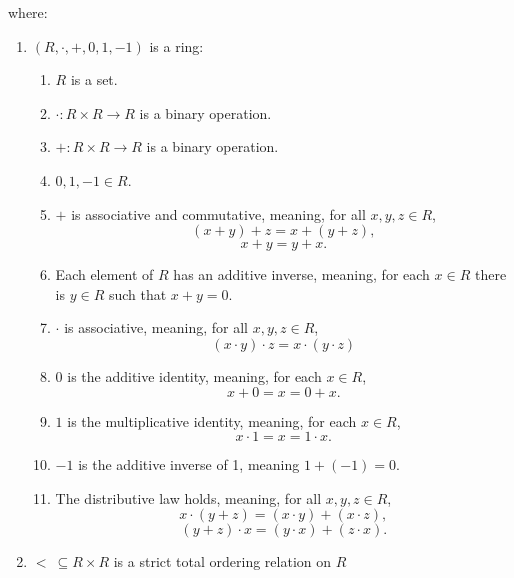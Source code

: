 \documentclass[11pt]{article}
\begin{document}
where:

\begin{enumerate}
	\item $(R, \cdot, +, 0, 1, -1)$ is a ring:
		\begin{enumerate}
			\item $R$ is a set.
			\item $\cdot : R \times R \to R$ is a binary operation.
			\item $+ : R \times R \to R$ is a binary operation.
			\item $0, 1, -1 \in R$.
			\item $+$ is associative and commutative, meaning, for all $x, y, z \in R$,
				\begin{equation}
					(x+y)+z = x+(y+z),
				\end{equation}
				\begin{equation}
					x+y=y+x.
				\end{equation}
			\item Each element of $R$ has an additive inverse, meaning, for each $x \in R$ there is $y \in R$ such that $x + y = 0$.
			\item $\cdot$ is associative, meaning, for all $x, y, z \in R$,
				\begin{equation}
					(x\cdot y)\cdot z = x \cdot (y \cdot z)
				\end{equation}
			\item $0$ is the additive identity, meaning, for each $x \in R$,
				\begin{equation}
					x + 0 = x = 0 + x.
				\end{equation}
			\item $1$ is the multiplicative identity, meaning, for each $x \in R$,
				\begin{equation}
					x \cdot 1 = x = 1 \cdot x.
				\end{equation}
			\item $-1$ is the additive inverse of 1, meaning $1 + (-1) = 0$.
			\item The distributive law holds, meaning, for all $x, y, z \in R$,
				\begin{equation}
					x \cdot (y+z) = (x \cdot y) + (x \cdot z),
				\end{equation}
				\begin{equation}
					(y+z) \cdot x = (y \cdot x) + (z \cdot x).
				\end{equation}
		\end{enumerate}
	\item $<\ \subseteq R \times R$ is a strict total ordering relation on $R$

\end{enumerate}
\end{document}

